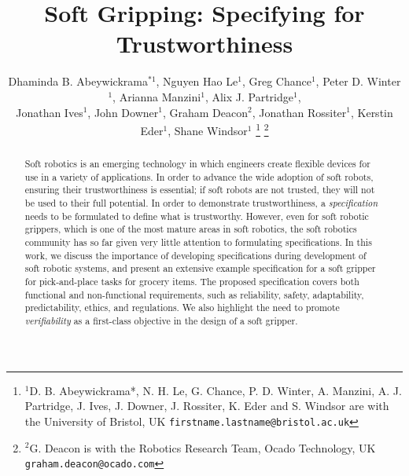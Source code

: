 \documentclass[letterpaper, 10 pt, conference]{ieeeconf}  %
\title{\LARGE \bf
	Soft Gripping: Specifying for Trustworthiness
}
\author{Dhaminda B. Abeywickrama$^{*1}$, Nguyen Hao Le$^{1}$, Greg Chance$^{1}$,  Peter D. Winter$^{1}$, Arianna Manzini$^{1}$, Alix J. Partridge$^{1}$, \\Jonathan Ives$^{1}$, John Downer$^{1}$, Graham Deacon$^{2}$, Jonathan Rossiter$^{1}$, Kerstin Eder$^{1}$, Shane Windsor$^{1}$%
\thanks{$^{1}$D. B. Abeywickrama*, N. H. Le, G. Chance, P. D. Winter, A. Manzini, A. J. Partridge, J. Ives, J. Downer, J. Rossiter,  K. Eder and S. Windsor are with the University of Bristol, UK
	{\tt\small firstname.lastname@bristol.ac.uk}}%
\thanks{$^{2}$G. Deacon is with the Robotics Research Team, Ocado Technology, UK
	{\tt\small graham.deacon@ocado.com}}%
}
\begin{document}
	
	
	
	\maketitle
	\thispagestyle{empty}
	\pagestyle{empty}
	
	
	\begin{abstract}
	Soft robotics is an emerging technology in which engineers create flexible devices for use in a variety of applications.
	In order to advance the wide adoption of soft robots, ensuring their trustworthiness is essential; if soft robots are not trusted, they will not be used to their full potential. 
	In order to demonstrate trustworthiness, a \emph{specification} needs to be formulated to define what is trustworthy. 
	However, even for soft robotic grippers, which is one of the most mature areas in soft robotics, the soft robotics community has so far given very little attention to formulating specifications. 
	In this work, we discuss the importance of developing specifications during development of soft robotic systems, and present an extensive example specification for a soft gripper for pick-and-place tasks for grocery items. The proposed specification covers both functional and non-functional requirements, such as reliability, safety, adaptability, predictability, ethics, and regulations.  
	We also highlight the need to promote \emph{verifiability} as a first-class objective in the design of a soft gripper.	
	\end{abstract}
	
\end{document}
